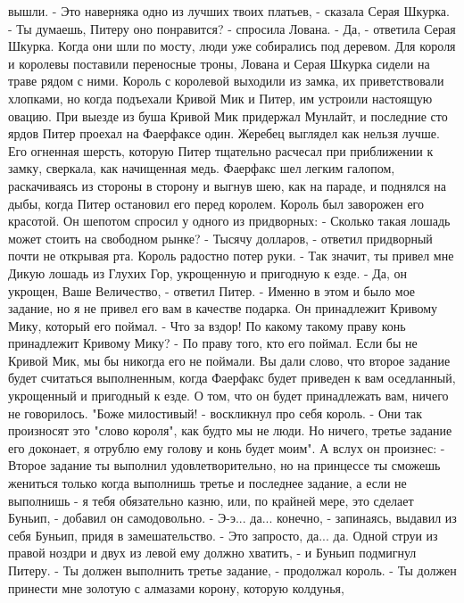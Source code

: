 вышли.
    - Это наверняка одно из лучших твоих платьев, - сказала Серая 
Шкурка.
    - Ты думаешь, Питеру оно понравится? - спросила Лована.
    - Да, - ответила Серая Шкурка.
    Когда они шли по мосту, люди уже собирались под деревом. Для 
короля и королевы поставили переносные троны, Лована и Серая Шкурка 
сидели на траве рядом с ними. Король с королевой выходили из замка, их 
приветствовали хлопками, но когда подъехали Кривой Мик и Питер, им 
устроили настоящую овацию.
    При выезде из буша Кривой Мик придержал Мунлайт, и последние сто 
ярдов Питер проехал на Фаерфаксе один. Жеребец выглядел как нельзя 
лучше. Его огненная шерсть, которую Питер тщательно расчесал при 
приближении к замку, сверкала, как начищенная медь. Фаерфакс шел 
легким галопом, раскачиваясь из стороны в сторону и выгнув шею, как на 
параде, и поднялся на дыбы, когда Питер остановил его перед королем. 
Король был заворожен его красотой. Он шепотом спросил у одного из 
придворных:
    - Сколько такая лошадь может стоить на свободном рынке?
    - Тысячу долларов, - ответил придворный почти не открывая рта. 
Король радостно потер руки.
    - Так значит, ты привел мне Дикую лошадь из Глухих Гор, укрощенную 
и пригодную к езде.
    - Да, он укрощен, Ваше Величество, - ответил Питер. - Именно в 
этом и было мое задание, но я не привел его вам в качестве подарка. Он 
принадлежит Кривому Мику, который его поймал.
    - Что за вздор! По какому такому праву конь принадлежит Кривому 
Мику?
    - По праву того, кто его поймал. Если бы не Кривой Мик, мы бы 
никогда его не поймали. Вы дали слово, что второе задание будет 
считаться выполненным, когда Фаерфакс будет приведен к вам оседланный, 
укрощенный и пригодный к езде. О том, что он будет принадлежать вам, 
ничего не говорилось.
    "Боже милостивый! - воскликнул про себя король. - Они так 
произносят это "слово короля", как будто мы не люди. Но ничего, третье 
задание его доконает, я отрублю ему голову и конь будет моим".
    А вслух он произнес:
    - Второе задание ты выполнил удовлетворительно, но на принцессе ты 
сможешь жениться только когда выполнишь третье и последнее задание, а 
если не выполнишь - я тебя обязательно казню, или, по крайней мере, 
это сделает Буньип, - добавил он самодовольно.
    - Э-э... да... конечно, - запинаясь, выдавил из себя Буньип, придя 
в замешательство. - Это запросто, да... да. Одной струи из правой 
ноздри и двух из левой ему должно хватить, - и Буньип подмигнул 
Питеру.
    - Ты должен выполнить третье задание, - продолжал король. - Ты 
должен принести мне золотую с алмазами корону, которую колдунья, 
